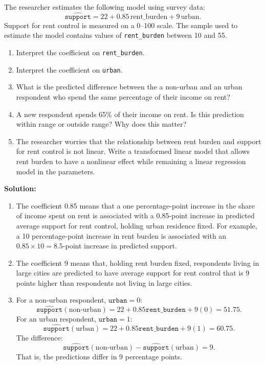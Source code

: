 \documentclass[12pt]{article}
\newif\ifsolutions
\begin{document}
\begin{enumerate}
    The researcher estimates the following model using survey data:
    \[
        \widehat{\texttt{support}}
        = 22 + 0.85\,\text{rent\_burden} + 9\,\text{urban}.
    \]
    Support for rent control is measured on a 0--100 scale. The sample used to estimate the model contains values of \texttt{rent\_burden} between 10 and 55.

    \begin{enumerate}[label=(\alph*)]
        \item Interpret the coefficient on \texttt{rent\_burden}.
        \item Interpret the coefficient on \texttt{urban}.
        \item What is the predicted difference between the a non-urban and an urban respondent who spend the same percentage of their income on rent?
        \item A new respondent spends 65\% of their income on rent. Is this prediction within range or outside range? Why does this matter?
        \item The researcher worries that the relationship between rent burden and support for rent control is not linear. Write a transformed linear model that allows rent burden to have a nonlinear effect while remaining a linear regression model in the parameters.
    \end{enumerate}

    \ifsolutions \color{blue} \textbf{Solution:} \\
    \begin{enumerate}[label=(\alph*)]
        \item The coefficient 0.85 means that a one percentage-point increase in the share of income spent on rent is associated with a 0.85-point increase in predicted average support for rent control, holding urban residence fixed. For example, a 10 percentage-point increase in rent burden is associated with an \(0.85 \times 10 = 8.5\)-point increase in predicted support.

        \item The coefficient 9 means that, holding rent burden fixed, respondents living in large cities are predicted to have average support for rent control that is 9 points higher than respondents not living in large cities.

        \item For a non-urban respondent, \(\texttt{urban}=0\):
        \[
            \widehat{\texttt{support}}(\text{non-urban}) = 22 + 0.85\texttt{rent\_burden} + 9(0) = 51.75.
        \]
        For an urban respondent, \(\texttt{urban}=1\):
        \[
            \widehat{\texttt{support}}(\text{urban}) = 22 + 0.85\texttt{rent\_burden} + 9(1) = 60.75.
        \]
        The difference:
        \[
        \widehat{\texttt{support}}(\text{non-urban}) - \widehat{\texttt{support}}(\text{urban}) = 9.
        \]
        That is, the predictions differ in 9 percentage points.


\end{enumerate}
\end{enumerate}
\end{document}
